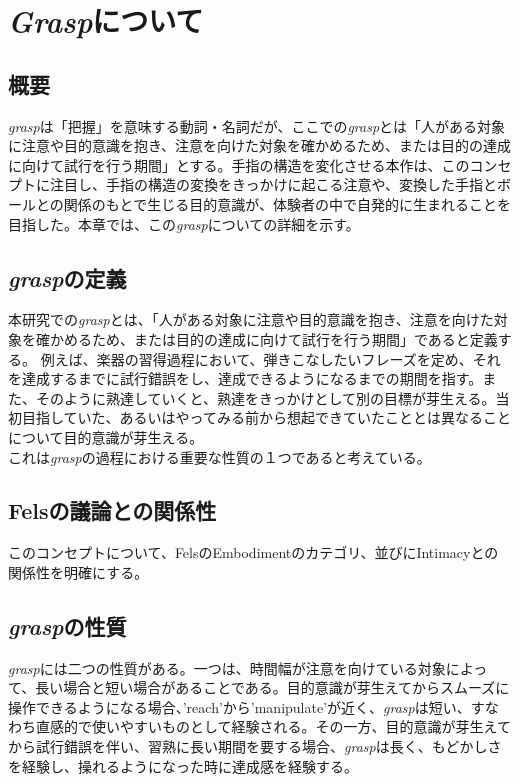 \chapter{\textit{Grasp}について}
\label{graspについて}

\section{概要}

\textit{grasp}は「把握」を意味する動詞・名詞だが、ここでの\textit{grasp}とは「人がある対象に注意や目的意識を抱き、注意を向けた対象を確かめるため、または目的の達成に向けて試行を行う期間」とする。手指の構造を変化させる本作は、このコンセプトに注目し、手指の構造の変換をきっかけに起こる注意や、変換した手指とボールとの関係のもとで生じる目的意識が、体験者の中で自発的に生まれることを目指した。本章では、この\textit{grasp}についての詳細を示す。\\

\section{\textit{grasp}の定義}
本研究での\textit{grasp}とは、「人がある対象に注意や目的意識を抱き、注意を向けた対象を確かめるため、または目的の達成に向けて試行を行う期間」であると定義する。
例えば、楽器の習得過程において、弾きこなしたいフレーズを定め、それを達成するまでに試行錯誤をし、達成できるようになるまでの期間を指す。また、そのように熟達していくと、熟達をきっかけとして別の目標が芽生える。当初目指していた、あるいはやってみる前から想起できていたこととは異なることについて目的意識が芽生える。\\
これは\textit{grasp}の過程における重要な性質の１つであると考えている。

\section{Felsの議論との関係性}
このコンセプトについて、FelsのEmbodimentのカテゴリ、並びにIntimacyとの関係性を明確にする。\\

\section{\textit{grasp}の性質}
\textit{grasp}には二つの性質がある。一つは、時間幅が注意を向けている対象によって、長い場合と短い場合があることである。目的意識が芽生えてからスムーズに操作できるようになる場合、'reach'から'manipulate'が近く、\textit{grasp}は短い、すなわち直感的で使いやすいものとして経験される。その一方、目的意識が芽生えてから試行錯誤を伴い、習熟に長い期間を要する場合、\textit{grasp}は長く、もどかしさを経験し、操れるようになった時に達成感を経験する。\\


